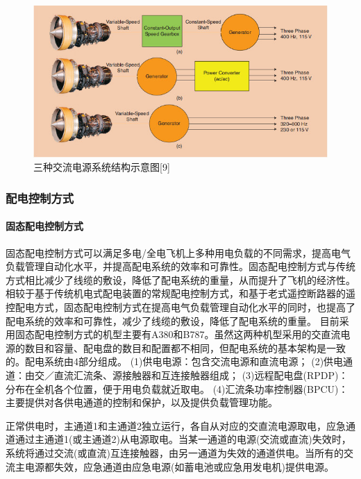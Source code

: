 \documentclass[12pt,a4paper]{report}
\begin{document}
\begin{figure}[htp]
\centering
   \includegraphics[width=.8\textwidth]{generators.jpg}
    \caption{三种交流电源系统结构示意图[9]}
    \label{fig:generators}
\end{figure}

\subsubsection{配电控制方式}
\paragraph{固态配电控制方式}
固态配电控制方式可以满足多电/全电飞机上多种用电负载的不同需求，提高电气负载管理自动化水平，并提高配电系统的效率和可靠性。固态配电控制方式与传统方式相比减少了线缆的敷设，降低了配电系统的重量，从而提升了飞机的经济性。
相较于基于传统机电式配电装置的常规配电控制方式，和基于老式遥控断路器的遥控配电方式，固态配电控制方式在提高电气负载管理自动化水平的同时，也提高了配电系统的效率和可靠性，减少了线缆的敷设，降低了配电系统的重量。
目前采用固态配电控制方式的机型主要有A380和B787。虽然这两种机型采用的交直流电源的数目和容量、配电盘的数目和配置都不相同，但配电系统的基本架构是一致的。配电系统由4部分组成。
(1)供电电源：包含交流电源和直流电源；
(2)供电通道：由交／直流汇流条、源接触器和互连接触器组成；
(3)远程配电盘(RPDP)：分布在全机各个位置，便于用电负载就近取电。
(4)汇流条功率控制器(BPCU)：主要提供对各供电通道的控制和保护，以及提供负载管理功能。

正常供电时，主通道1和主通道2独立运行，各自从对应的交直流电源取电，应急通道通过主通道1(或主通道2)从电源取电。当某一通道的电源(交流或直流)失效时，系统将通过交流(或直流)互连接触器，由另一通道为失效的通道供电。当所有的交流主电源都失效，应急通道由应急电源(如蓄电池或应急用发电机)提供电源。
 
\end{document}
